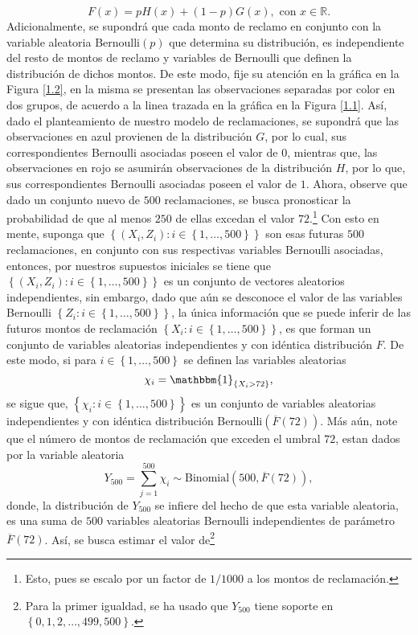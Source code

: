 \documentclass[10.5pt,notitlepage]{article}
\newcommand{\RR}{\mathbb{R}}
\newcommand{\kis}[1]{\left\{ #1 \right\}}
\theoremstyle{plain}
\begin{document}
\begin{equation}\label{lab.2323}
    F(x) = pH(x) + (1 - p)G(x), \text{ con } x \in \RR.
\end{equation}
Adicionalmente, se supondrá que cada monto de reclamo en conjunto con la variable aleatoria Bernoulli\((p)\) que determina su distribución, es independiente del resto de montos de reclamo y variables de Bernoulli que definen la distribución de dichos montos. De este modo, fije su atención en la gráfica en la Figura \ref{1.2}, en la misma se presentan las observaciones separadas por color en dos grupos, de acuerdo a la linea trazada en la gráfica en la Figura \ref{1.1}. Así, dado el planteamiento de nuestro modelo de reclamaciones, se supondrá que las observaciones en azul provienen de la distribución \(G\), por lo cual, sus correspondientes Bernoulli asociadas poseen el valor de \(0\), mientras que, las observaciones en rojo se asumirán observaciones de la distribución \(H\), por lo que, sus correspondientes Bernoulli asociadas poseen el valor de \(1\). Ahora, observe que dado un conjunto nuevo de \(500\) reclamaciones, se busca pronosticar la probabilidad de que al menos \(250\) de ellas excedan el valor \(72\).\footnote{Esto, pues se escalo por un factor de \(1/1000\) a los montos de reclamación.} Con esto en mente, suponga que \(\kis{(X_i,Z_i) : i \in \kis{1, \hdots, 500} }\) son esas futuras \(500\) reclamaciones, en conjunto con sus respectivas variables Bernoulli asociadas, entonces, por nuestros supuestos iniciales se tiene que \(\kis{(X_i,Z_i) : i \in \kis{1, \hdots, 500}}\) es un conjunto de vectores aleatorios independientes, sin embargo, dado que aún se desconoce el valor de las variables Bernoulli \(\kis{Z_i: i \in  \kis{1, \hdots, 500}}\), la única información que se puede inferir de las futuros montos de reclamación \(\kis{X_i: i\in\kis{1, \hdots, 500}}\), es que forman un conjunto de variables aleatorias independientes y con idéntica distribución \(F\). De este modo, si para \(i \in \kis{1, \hdots, 500}\)  se definen las variables aleatorias 
\[
\chi_{i} = \mathbbm{1}_{\kis{X_i > 72}}, 
\]
se sigue que, \(\kis{\chi_i : i \in \kis{1, \hdots, 500}}\) es un conjunto de variables aleatorias independientes y con idéntica distribución Bernoulli\((\overline{F}(72))\). Más aún, note que el número de montos de reclamación que exceden el umbral \(72\), estan dados por la variable aleatoria 
\[
Y_{500} = \sum_{j = 1}^{500}\chi_{i} \sim \text{Binomial}(500,\overline{F}(72)),
\]
donde, la distribución de \(Y_{500}\) se infiere del hecho de que esta variable aleatoria, es una suma de \(500\) variables aleatorias Bernoulli independientes de parámetro \(\overline{F}(72)\). Así, se busca estimar el valor de\footnote{Para la primer igualdad, se ha usado que \(Y_{500}\) tiene soporte en \(\kis{0,1,2,\hdots,499, 500}\).}
\end{document}
